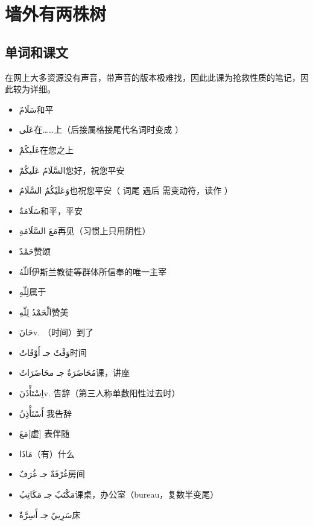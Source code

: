 \chapter{墙外有两株树}

\section{ 单词和课文}

\begin{note}
     在网上大多资源没有声音，带声音的版本极难找，因此此课为抢救性质的笔记，因此较为详细。
\end{note}

\begin{itemize}
    \item \ac{سَلَامٌ}{和平}
    \item \ac{عَلَى}{在……上（后接属格接尾代名词时变成 ）}
    \item \ac{عَلَيكُمْ}{在您之上}
    \item \ac{السَّلَامُ عَلَيكُمْ}{您好，祝您平安}
    \item \ac{وَعَلَيْكُمُ السَّلَامُ}{也祝您平安（  词尾  遇后  需变动符，读作 ）}
    \item \ac{سَلَامَةٌ}{和平，平安}
    \item \ac{مَعَ السَّلَامَةِ}{再见（习惯上只用阴性）}
    \item \ac{حَمْدٌ}{赞颂}
    \item \ac{اَللّٰهُ}{伊斯兰教徒等群体所信奉的唯一主宰}
    \item \ac{لِلّٰهِ}{属于 }
    \item \ac{اَلْحَمْدُ لِلّٰهِ}{赞美 }
    \item \ac{حَانَ}{v. （时间）到了}
    \item \ac{وَقْتٌ جـ أَوْقَاتَُ}{时间}
    \item \ac{مُحَاضَرَةٌ جـ محَاضَرَاتٌ}{课，讲座}
    \item \ac{اِسْتَأْذَنَ}{v. 告辞（第三人称单数阳性过去时）}
    \item \ac{أَسْتَأْذِنُ }{我告辞}
    \item \ac{مَعَ}{[虚] 表伴随}
    \item \ac{مَاذَا}{（有）什么}
    \item \ac{غُرْفَةٌ جـ غُرَفٌ}{房间}
    \item \ac{مَكْتَبٌ جـ مَكَاتِبُ}{课桌，办公室（bureau，复数半变尾）}
    \item \ac{سَرِييٌ جـ أَسِرَّةٌ}{床}

\end{itemize}
